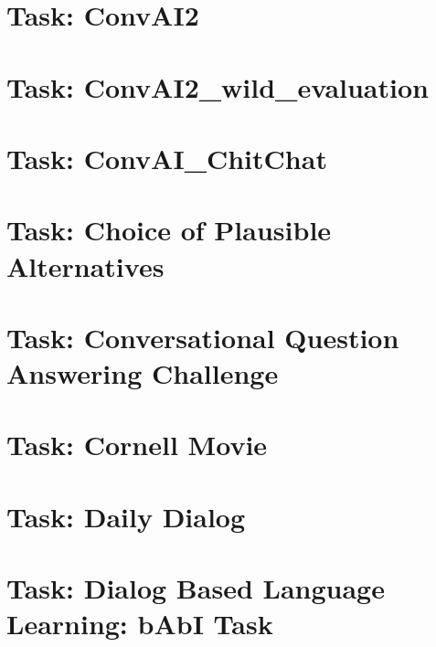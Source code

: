\documentclass[twoside]{book}
\newcommand{\+}{\discretionary{\mbox{\scriptsize$\hookleftarrow$}}{}{}}
\begin{document}
\chapter{Task\+: Conv\+A\+I2}
\label{md_parlai_tasks_convai2_README}

\chapter{Task\+: Conv\+A\+I2\+\_\+wild\+\_\+evaluation}
\label{md_parlai_tasks_convai2_wild_evaluation_README}

\chapter{Task\+: Conv\+A\+I\+\_\+\+Chit\+Chat}
\label{md_parlai_tasks_convai_chitchat_README}

\chapter{Task\+: Choice of Plausible Alternatives}
\label{md_parlai_tasks_copa_README}

\chapter{Task\+: Conversational Question Answering Challenge}
\label{md_parlai_tasks_coqa_README}

\chapter{Task\+: Cornell Movie}
\label{md_parlai_tasks_cornell_movie_README}

\chapter{Task\+: Daily Dialog}
\label{md_parlai_tasks_dailydialog_README}

\chapter{Task\+: Dialog Based Language Learning\+: b\+AbI Task}
\label{md_parlai_tasks_dbll_babi_README}

\end{document}
